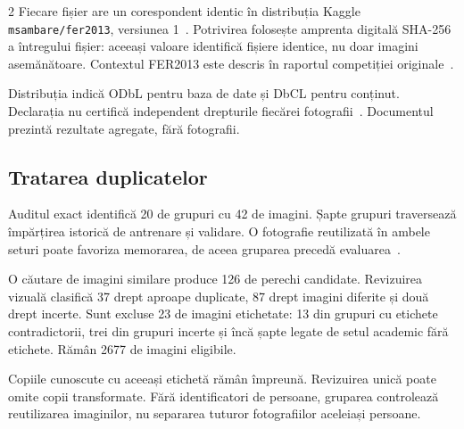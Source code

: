 \documentclass[10pt,a4paper]{article}
\begin{document}
\begin{multicols}{2}
Fiecare fișier are un corespondent identic în distribuția Kaggle
\texttt{msambare/fer2013}, versiunea 1~\cite{kaggle}. Potrivirea folosește
amprenta digitală SHA-256 a întregului fișier: aceeași valoare identifică
fișiere identice, nu doar imagini asemănătoare. Contextul FER2013 este
descris în raportul competiției originale~\cite{fer}.

Distribuția indică ODbL pentru baza de date și DbCL pentru conținut.
Declarația nu certifică independent drepturile fiecărei fotografii~\cite{license}.
Documentul prezintă rezultate agregate, fără fotografii.

\subsection{Tratarea duplicatelor}
Auditul exact identifică 20 de grupuri cu 42 de imagini. Șapte grupuri
traversează împărțirea istorică de antrenare și validare. O fotografie
reutilizată în ambele seturi poate favoriza memorarea, de aceea gruparea
precedă evaluarea~\cite{duplicates}.

O căutare de imagini similare produce 126 de perechi candidate. Revizuirea
vizuală clasifică 37 drept aproape duplicate, 87 drept imagini diferite și
două drept incerte. Sunt excluse 23 de imagini etichetate: 13 din grupuri
cu etichete contradictorii, trei din grupuri incerte și încă șapte legate
de setul academic fără etichete. Rămân 2677 de imagini eligibile.

Copiile cunoscute cu aceeași etichetă rămân împreună. Revizuirea unică
poate omite copii transformate. Fără identificatori de persoane, gruparea
controlează reutilizarea imaginilor, nu separarea tuturor fotografiilor
aceleiași persoane.
\end{multicols}

\newpage
\end{document}
